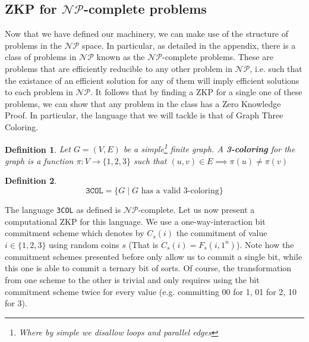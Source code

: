 \documentclass{article}
\newtheorem{definition}{Definition}
\begin{document}
\subsection{ZKP for $\mathcal{NP}$-complete problems}
Now that we have defined our machinery, we can make use of the structure of problems in the $\mathcal{NP}$ space.
In particular, as detailed in the appendix, there is a class of problems in $\mathcal{NP}$ known as the $\mathcal{NP}$-complete problems.
These are problems that are efficiently reducible to any other problem in $\mathcal{NP}$, i.e. such that the existance of an efficient solution for any of them will imply efficient solutions to each problem in $\mathcal{NP}$.
It follows that by finding a ZKP for a single one of these problems, we can show that any problem in the class has a Zero Knowledge Proof. 
In particular, the language that we will tackle is that of Graph Three Coloring.
\begin{definition}
    Let $G = (V, E)$ be a simple\footnote{Where by simple we disallow loops and parallel edges} finite graph. A \textbf{3-coloring} for the graph is a function $\pi: V \to \{1, 2, 3\}$
    such that $(u, v) \in E \implies \pi(u) \neq \pi(v)$
\end{definition}
\begin{definition}
    \[ \texttt{3COL} = \{ G \; | \; G \text{ has a valid 3-coloring} \} \]
\end{definition}
The language \texttt{3COL} as defined is $\mathcal{NP}$-complete. 
Let us now present a computational ZKP \cite{goldreichProofsThatYield1991} \cite{goldreichMethodologyCryptographicProtocol} for this language. We use a one-way-interaction bit commitment scheme which denotes by 
$C_s(i)$ the commitment of value $i \in \{1, 2, 3\}$ using random coins $s$ (That is $C_s(i) = F_s(i, 1^n)$). Note how the commitment schemes 
presented before only allow us to commit a single bit, while this one is able to commit a ternary bit of sorts. Of course, the transformation
from one scheme to the other is trivial and only requires using the bit commitment scheme twice for every value (e.g. committing 00 for 1, 01 for 2, 10 for 3).
\end{document}
